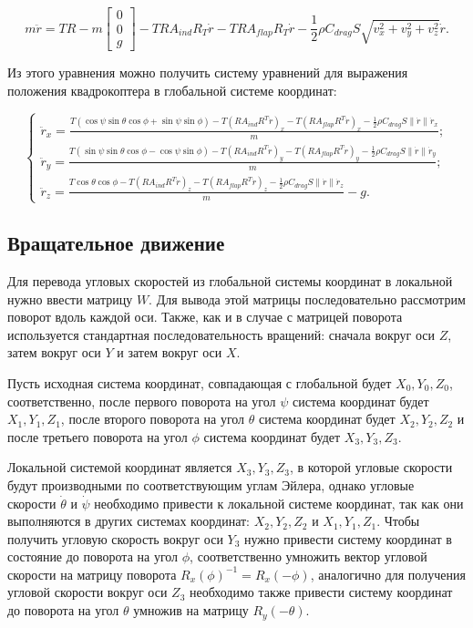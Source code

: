 \begin{equation}
m \ddot{r} =
T R - m \begin{bmatrix} 0 \\ 0 \\ g \end{bmatrix} - T R A_{ind} R_T \dot{r} - T R A_{flap} R_T \dot{r} -  \frac{1}{2} \rho C_{drag} S \sqrt{v_x^2 + v_y^2 + v_z^2} \dot{r}
.\end{equation}

Из этого уравнения можно получить систему уравнений для выражения положения квадрокоптера в глобальной системе координат:

\begin{equation}
\begin{cases}
    \ddot{r}_x = \frac{T (\cos \psi \sin \theta \cos \phi + \sin \psi \sin \phi) - T (R A_{ind} R^T \dot{r})_x - T (R A_{flap} R^T \dot{r})_x - \frac{1}{2} \rho C_{drag} S \|\dot{r}\| \dot{r}_x}{m}; \\
    \ddot{r}_y = \frac{T (\sin \psi \sin \theta \cos \phi - \cos \psi \sin \phi) - T (R A_{ind} R^T \dot{r})_y - T (R A_{flap} R^T \dot{r})_y - \frac{1}{2} \rho C_{drag} S \|\dot{r}\| \dot{r}_y}{m}; \\
    \ddot{r}_z = \frac{T \cos\theta\cos\phi - T (R A_{ind} R^T \dot{r})_z - T (R A_{flap} R^T \dot{r})_z - \frac{1}{2} \rho C_{drag} S \|\dot{r}\| \dot{r}_z}{m} - g.
\end{cases}
\end{equation}

\subsection{Вращательное движение}

Для перевода угловых скоростей из глобальной системы координат в локальной  
нужно ввести матрицу \(W\). Для вывода этой матрицы последовательно рассмотрим поворот вдоль каждой оси.
Также, как и в случае с матрицей поворота используется стандартная последовательность вращений: сначала вокруг оси
\(Z\), затем вокруг оси \(Y\) и затем вокруг оси \(X\).

Пусть исходная система координат, совпадающая с глобальной будет \(X_0, Y_0, Z_0\), соответственно, 
после первого поворота на угол \(\psi\) система координат будет \(X_1, Y_1, Z_1\), после второго поворота
на угол \(\theta\) система координат будет \(X_2, Y_2, Z_2\) и после третьего поворота на угол \(\phi\)
система координат будет \(X_3, Y_3, Z_3\).

Локальной системой координат является \(X_3, Y_3, Z_3\), в которой угловые скорости будут производными по
соответствующим углам Эйлера, однако угловые скорости \(\dot{\theta}\) и \(\dot{\psi}\) необходимо привести к 
локальной системе координат, так как они выполняются в других системах координат: \(X_2, Y_2, Z_2\) и \(X_1, Y_1, Z_1\).
Чтобы получить угловую скорость вокруг оси \(Y_3\) нужно привести систему координат в состояние до поворота на угол \(\phi\),
соответственно умножить вектор угловой скорости на матрицу поворота \(R_x(\phi)^{-1}=R_x(-\phi)\), аналогично для получения
угловой скорости вокруг оси \(Z_3\) необходимо также привести систему координат до поворота на угол \(\theta\) умножив на матрицу \(R_y(-\theta)\).

